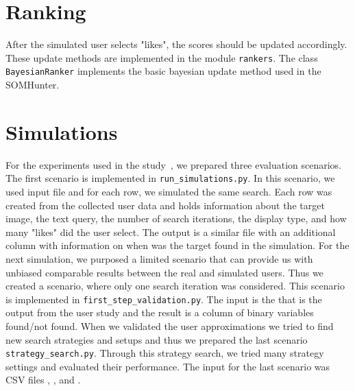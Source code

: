 \section{Ranking}

After the simulated user selects "likes", the scores should be updated accordingly. These update methods are implemented in the module \lstinline{rankers}. The class \lstinline{BayesianRanker} implements the basic bayesian update method used in the SOMHunter.

\section{Simulations}

For the experiments used in the study~\cite{peska2021}, we prepared three evaluation scenarios. The first scenario is implemented in \lstinline{run_simulations.py}. In this scenario, we used input file  and for each row, we simulated the same search. Each row was created from the collected user data and holds information about the target image, the text query,  the number of search iterations, the display type, and how many "likes" did the user select. The output is a similar file with an additional column with information on when was the target found in the simulation. For the next simulation, we purposed a limited scenario that can provide us with unbiased comparable results between the real and simulated users. Thus we created a scenario, where only one search iteration was considered. This scenario is implemented in \lstinline{first_step_validation.py}. The input is the  that is the output from the user study and the result is a column of binary variables found/not found. When we validated the user approximations we tried to find new search strategies and setups and thus we prepared the last scenario \lstinline{strategy_search.py}. Through this strategy search, we tried many strategy settings and evaluated their performance. The input for the last scenario was CSV files , , and .


